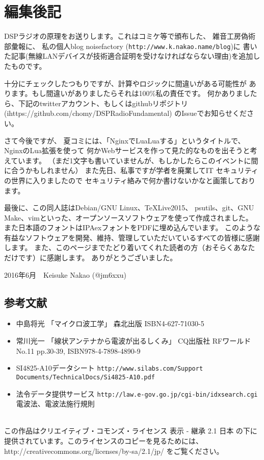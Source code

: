 \section*{編集後記}
DSPラジオの原理をお送りします。これはコミケ等で頒布した、
雑音工房偽術部彙報に、
私の個人blog noisefactory (\texttt{http://www.k.nakao.name/blog})に
書いた記事(無線LANデバイスが技術適合証明を受けなければならない理由)を追加したものです。

十分にチェックしたつもりですが、計算やロジックに間違いがある可能性が
あります。もし間違いがありましたらそれは100\%私の責任です。
何かありましたら、下記のtwitterアカウント、もしくはgithubリポジトリ
(ihttps://github.com/chomy/DSPRadioFundamental)
のIssueでお知らせください。


さて今後ですが、
夏コミには、「NginxでLuaLuaする」というタイトルで、NginxのLua拡張を使って
何かWebサービスを作って見た的なものを出そうと考えています。
（まだ1文字も書いていませんが、もしかしたらこのイベントに間に合うかもしれません）
また先日、私事ですが学者を廃業してIT セキュリティの世界に入りましたので
セキュリティ絡みで何か書けないかなと画策しております。

最後に、この同人誌はDebian/GNU Linux、\TeX Live2015、
psutils、git、GNU Make、vimといった、オープンソースソフトウェアを使って作成されました。
また日本語のフォントはIPAexフォントをPDFに埋め込んでいます。
このような有益なソフトウェアを開発、維持、管理していただいているすべての皆様に感謝します。
また、このページまでたどり着いてくれた読者の方（おそらくあなただけです）に感謝します。
ありがとうございました。

\begin{flushright}
2016年6月　Keisuke Nakao (@jm6xxu) 
\end{flushright}
\clearpage
\subsection*{参考文献}
\begin{itemize}
  \item 中島将光
    「マイクロ波工学」 森北出版 ISBN4-627-71030-5
  \item 常川光一
    「線状アンテナから電波が出るしくみ」 CQ出版社 RFワールド No.11 pp.30-39, ISBN978-4-7898-4890-9

  \item 
    SI4825-A10データシート \texttt{http://www.silabs.com/Support Documents/TechnicalDocs/Si4825-A10.pdf}
	\item
	法令データ提供サービス \texttt{http://law.e-gov.go.jp/cgi-bin/idxsearch.cgi} 電波法、電波法施行規則
   \end{itemize}
\clearpage
\mbox{}
\vspace{36em}\\
この作品はクリエイティブ・コモンズ・ライセンス 表示 - 継承 2.1 日本 の下に提供されています。このライセンスのコピーを見るためには、http://creativecommons.org/licenses/by-sa/2.1/jp/ をご覧ください。
